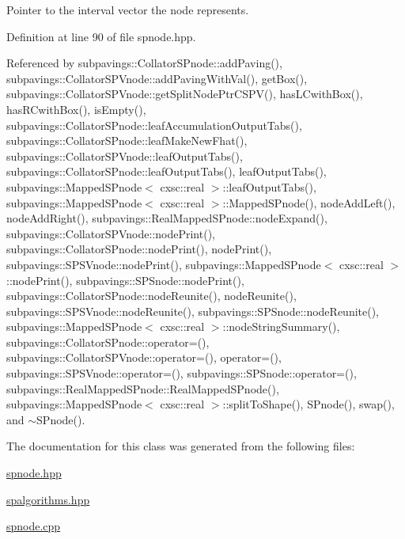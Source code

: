 \-Pointer to the interval vector the node represents. 



\-Definition at line 90 of file spnode.\-hpp.



\-Referenced by subpavings\-::\-Collator\-S\-Pnode\-::add\-Paving(), subpavings\-::\-Collator\-S\-P\-Vnode\-::add\-Paving\-With\-Val(), get\-Box(), subpavings\-::\-Collator\-S\-P\-Vnode\-::get\-Split\-Node\-Ptr\-C\-S\-P\-V(), has\-L\-Cwith\-Box(), has\-R\-Cwith\-Box(), is\-Empty(), subpavings\-::\-Collator\-S\-Pnode\-::leaf\-Accumulation\-Output\-Tabs(), subpavings\-::\-Collator\-S\-Pnode\-::leaf\-Make\-New\-Fhat(), subpavings\-::\-Collator\-S\-P\-Vnode\-::leaf\-Output\-Tabs(), subpavings\-::\-Collator\-S\-Pnode\-::leaf\-Output\-Tabs(), leaf\-Output\-Tabs(), subpavings\-::\-Mapped\-S\-Pnode$<$ cxsc\-::real $>$\-::leaf\-Output\-Tabs(), subpavings\-::\-Mapped\-S\-Pnode$<$ cxsc\-::real $>$\-::\-Mapped\-S\-Pnode(), node\-Add\-Left(), node\-Add\-Right(), subpavings\-::\-Real\-Mapped\-S\-Pnode\-::node\-Expand(), subpavings\-::\-Collator\-S\-P\-Vnode\-::node\-Print(), subpavings\-::\-Collator\-S\-Pnode\-::node\-Print(), node\-Print(), subpavings\-::\-S\-P\-S\-Vnode\-::node\-Print(), subpavings\-::\-Mapped\-S\-Pnode$<$ cxsc\-::real $>$\-::node\-Print(), subpavings\-::\-S\-P\-Snode\-::node\-Print(), subpavings\-::\-Collator\-S\-Pnode\-::node\-Reunite(), node\-Reunite(), subpavings\-::\-S\-P\-S\-Vnode\-::node\-Reunite(), subpavings\-::\-S\-P\-Snode\-::node\-Reunite(), subpavings\-::\-Mapped\-S\-Pnode$<$ cxsc\-::real $>$\-::node\-String\-Summary(), subpavings\-::\-Collator\-S\-Pnode\-::operator=(), subpavings\-::\-Collator\-S\-P\-Vnode\-::operator=(), operator=(), subpavings\-::\-S\-P\-S\-Vnode\-::operator=(), subpavings\-::\-S\-P\-Snode\-::operator=(), subpavings\-::\-Real\-Mapped\-S\-Pnode\-::\-Real\-Mapped\-S\-Pnode(), subpavings\-::\-Mapped\-S\-Pnode$<$ cxsc\-::real $>$\-::split\-To\-Shape(), \-S\-Pnode(), swap(), and $\sim$\-S\-Pnode().



\-The documentation for this class was generated from the following files\-:\begin{DoxyCompactItemize}
\item 
\hyperlink{spnode_8hpp}{spnode.\-hpp}\item 
\hyperlink{spalgorithms_8hpp}{spalgorithms.\-hpp}\item 
\hyperlink{spnode_8cpp}{spnode.\-cpp}\end{DoxyCompactItemize}
